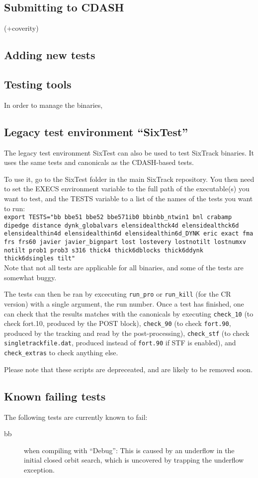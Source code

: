 \documentclass[english]{article}
\begin{document}
\subsection{Submitting to CDASH}

(+coverity)

\subsection{Adding new tests}

\subsection{Testing tools}
In order to manage the binaries, 

\subsection{Legacy test environment ``SixTest''}

The legacy test environment SixTest can also be used to test SixTrack binaries.
It uses the same tests and canonicals as the CDASH-based tests.

To use it, go to the SixTest folder in the main SixTrack repository.
You then need to set the EXECS environment variable to the full path of the executable(s) you want to test, and the TESTS variable to a list of the names of the tests you want to run:\\
{
  \texttt{export TESTS="bb bbe51 bbe52 bbe571ib0  bbinbb\_ntwin1 bnl crabamp dipedge distance dynk\_globalvars elensidealthck4d elensidealthck6d elensidealthin4d elensidealthin6d elensidealthin6d\_DYNK eric exact fma frs frs60 javier javier\_bignpart lost lostevery lostnotilt lostnumxv notilt prob1 prob3 s316 thick4 thick6dblocks thick6ddynk thick6dsingles tilt"}
}\\
Note that not all tests are applicable for all binaries, and some of the tests are somewhat buggy.

The tests can then be ran by excecuting \texttt{run\_pro} or \texttt{run\_kill} (for the CR version) with a single argument, the run number.
Once a test has finished, one can check that the results matches with the canonicals by executing \texttt{check\_10} (to check fort.10, produced by the POST block), \texttt{check\_90} (to check \texttt{fort.90}, produced by the tracking and read by the post-processing), \texttt{check\_stf} (to check \texttt{singletrackfile.dat}, produced instead of \texttt{fort.90} if STF is enabled), and \texttt{check\_extras} to check anything else.

Please note that these scripts are depreceated, and are likely to be removed soon.

\subsection{Known failing tests}
The following tests are currently known to fail:
\begin{description}
\item[bb] when compiling with ``Debug'': This is caused by an underflow in the initial closed orbit search, which is uncovered by trapping the underflow exception.
\end{description}
\end{document}
